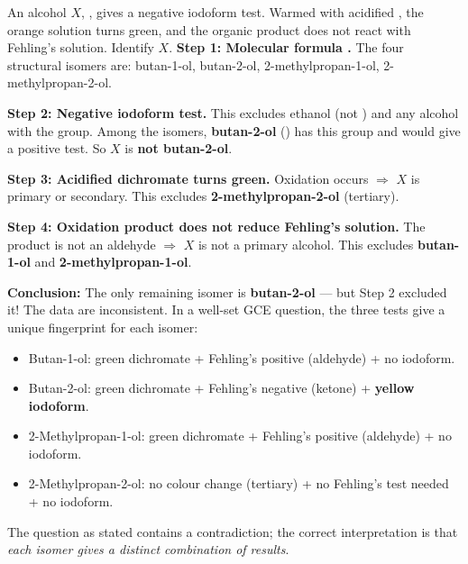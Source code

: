\documentclass[11pt]{article}
\begin{document}
\begin{exoresolu}
An alcohol $X$, , gives a negative iodoform test. Warmed with acidified , the orange solution turns green, and the organic product does not react with Fehling's solution. Identify $X$.
\tcblower
\textbf{Step 1: Molecular formula .} The four structural isomers are: butan-1-ol, butan-2-ol, 2-methylpropan-1-ol, 2-methylpropan-2-ol.

\textbf{Step 2: Negative iodoform test.} This excludes ethanol (not ) and any alcohol with the  group. Among the isomers, \textbf{butan-2-ol} () has this group and would give a positive test. So $X$ is \textbf{not butan-2-ol}.

\textbf{Step 3: Acidified dichromate turns green.} Oxidation occurs $\Rightarrow$ $X$ is primary or secondary. This excludes \textbf{2-methylpropan-2-ol} (tertiary).

\textbf{Step 4: Oxidation product does not reduce Fehling's solution.} The product is not an aldehyde $\Rightarrow$ $X$ is not a primary alcohol. This excludes \textbf{butan-1-ol} and \textbf{2-methylpropan-1-ol}.

\textbf{Conclusion:} The only remaining isomer is \textbf{butan-2-ol} — but Step 2 excluded it! The data are inconsistent. In a well-set GCE question, the three tests give a unique fingerprint for each isomer:
\begin{itemize}
\item Butan-1-ol: green dichromate + Fehling's positive (aldehyde) + no iodoform.
\item Butan-2-ol: green dichromate + Fehling's negative (ketone) + \textbf{yellow iodoform}.
\item 2-Methylpropan-1-ol: green dichromate + Fehling's positive (aldehyde) + no iodoform.
\item 2-Methylpropan-2-ol: no colour change (tertiary) + no Fehling's test needed + no iodoform.
\end{itemize}
The question as stated contains a contradiction; the correct interpretation is that \emph{each isomer gives a distinct combination of results}.
\end{exoresolu}
\end{document}
